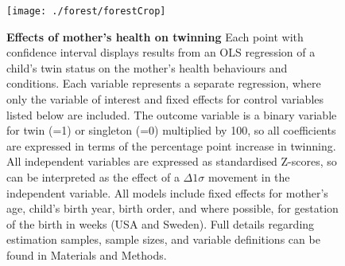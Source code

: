 \documentclass[12pt]{article}
\begin{document}
\begin{spacing}{1}
  \clearpage
\thispagestyle{empty}
\begin{figure}
\begin{center}
  \texttt{[image: ./forest/forestCrop]}
\end{center}
\caption{\textbf{Effects of mother's health on twinning} {\footnotesize Each point with confidence interval displays results from an OLS regression of a child's twin status on the mother's health behaviours and conditions. Each variable represents a separate regression, where only the variable of interest and fixed effects for control variables listed below are included. The outcome variable is a binary variable for twin (=1) or singleton (=0) multiplied by 100, so all coefficients are expressed in terms of the percentage point increase in twinning.  All independent variables are expressed as standardised Z-scores, so can be interpreted as the effect of a $\Delta 1\sigma$ movement in the independent variable. All models include fixed effects for mother's age, child's birth year, birth order, and where possible, for gestation of the birth in weeks (USA and Sweden).  Full details regarding estimation samples, sample sizes, and variable definitions can be found in Materials and Methods.}}
\label{fig:fullEsts}
\end{figure}
  \clearpage


\end{spacing}
\end{document}
